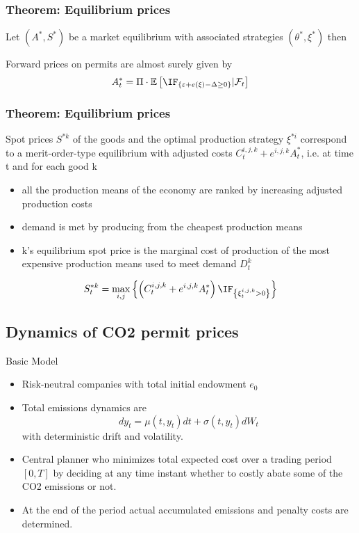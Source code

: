 \begin{frame}\frametitle{Theorem: Equilibrium prices}
Let $(A^*,S^*)$ be a market equilibrium with associated strategies $(\theta^*,\xi^*)$ then

Forward prices on permits are almost surely given by \[
A^*_t = \Pi \cdot \mathbb{E} \left[ \IF_{\left\{ \varepsilon + e(\xi) - \Delta \ge 0 \right\}} | \mathcal{F}_t \right]
\]

\end{frame}


\begin{frame}\frametitle{Theorem: Equilibrium prices}
 Spot prices $S^{*k}$ of the goods and the optimal production strategy $\xi^{*i}$ correspond to a merit-order-type equilibrium with adjusted costs $C_t^{i,j,k} + e^{i,j,k} A_t^*$, i.e. at time t and for each good k
\begin{itemize}
\item all the production means of the economy are ranked by increasing adjusted production costs
\item demand is met by producing from the cheapest production means
\item k's equilibrium spot price is the marginal cost of production of the most expensive production means used to meet demand $D_t^k$
\end{itemize}
\[
S_t^{*k} = \max_{i,j} \left\{ \left(C_t^{i,j,k} + e^{i,j,k} A_t^* \right) \IF_{\left\{\xi_t^{i,j,k}>0\right\}}\right\}
\]
\end{frame}

\subsection{Dynamics of CO2 permit prices}

{Basic Model}
\begin{itemize}
\item<1-> Risk-neutral companies with total initial endowment $e_0$
\item<2-> Total emissions dynamics are
\begin{equation}
dy_t= \mu(t, y_t)dt + \sigma(t, y_t)dW_t
\end{equation}
with deterministic drift and volatility.
\item<3-> Central planner who minimizes total expected cost over a trading period $[0,T]$ by deciding at any time instant
whether to costly abate some of the CO2 emissions or not.
\item<4-> At the end of the period actual accumulated emissions and penalty costs are determined.
\end{itemize}



